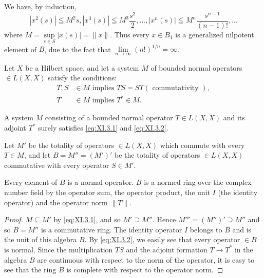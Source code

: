 We have, by induction, 
\[
\left| x ^{2} (s) \right| \leqq M ^{2} s, \left| x ^{3} (s) \right| \leqq M ^{3} \frac {s ^{2}}{2}, \dots , \left| x ^{n} (s) \right| \leqq M ^{n} \frac {s ^{n-1}}{(n - 1) !}, \dots
\]
where $M = \sup\limits_{s \in S} |x(s)| = \|x\|$. Thus every $x \in B_1$ is a generalized nilpotent element of $B$, due to the fact that $\lim\limits_{n \to \infty} (n!)^{1/n} = \infty$. 


\label{sec:XI.3}

Let $X$ be a Hilbert space, and let a system $M$ of bounded normal operators $\in L(X, X)$ satisfy the conditions: 
\begin{align}
T, S& \in M \text{ implies } T S = S T (\text{ commutativity }), \label{eq:XI.3.1} \\
T& \in M \text{ implies } T ^{*} \in M. \label{eq:XI.3.2}
\end{align}

A system $M$ consisting of a bounded normal operator $T \in L(X, X)$ and its adjoint $T^{*}$ surely satisfies \eqref{eq:XI.3.1} and \eqref{eq:XI.3.2}. 

Let $M'$ be the totality of operators $\in L(X, X)$ which commute with every $T \in M$, and let $B = M'' = (M')'$ be the totality of operators $\in L(X, X)$ commutative with every operator $S \in M'$. 

\begin{proposition}\label{prop:XI.3.Proposition.1} Every element of $B$ is a normal operator. $B$ is a normed ring over the complex number field by the operator sum, the operator product, the unit $I$ (the identity operator) and the operator norm $\|T\|$. 
\end{proposition}

\begin{proof}
 $M \subseteq M'$ by \eqref{eq:XI.3.1}, and so $M' \supseteq M''$. Hence $M''' = (M'')' \supseteq M''$ and so $B = M''$ is a commutative ring. The identity operator $I$ belongs to $B$ and is the unit of this algebra $B$. By \eqref{eq:XI.3.2}, we easily see that every operator $\in B$ is normal. Since the multiplication $TS$ and the adjoint formation $T \to T^*$ in the algebra $B$ are continuous with respect to the norm of the operator, it is easy to see that the ring $B$ is complete with respect to the operator norm. 
\end{proof}

